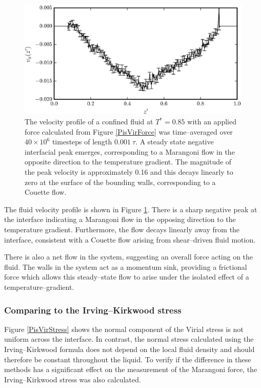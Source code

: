 \begin{figure}[h!]
\centering
\includegraphics[scale=1.0]{PisVirFlow}
\caption{The velocity profile of a confined fluid at $T^{*}=0.85$ with an applied force calculated from Figure \ref{PisVirForce} was time--averaged over $40 \times 10^{6}$ timesteps of length $0.001\ \tau$.
A steady state negative interfacial peak emerges, corresponding to a Marangoni flow in the opposite direction to the temperature gradient.
The magnitude of the peak velocity is approximately 0.16 and this decays linearly to zero at the surface of the bounding walls, corresponding to a Couette flow.}
\label{PisVirFlow}
\end{figure}
The fluid velocity profile is shown in Figure \ref{PisVirFlow}. 
There is a sharp negative peak at the interface indicating a Marangoni flow in the opposing direction to the temperature gradient.
Furthermore, the flow decays linearly away from the interface, consistent with a Couette flow arising from shear--driven fluid motion.\cite{FluidMech}

There is also a net flow in the system, suggesting an overall force acting on the fluid.
The walls in the system act as a momentum sink, providing a frictional force which allows this steady--state flow to arise under the isolated effect of a temperature--gradient.
\FloatBarrier

\subsubsection{Comparing to the Irving--Kirkwood stress}
Figure \ref{PisVirStress} shows the normal component of the Virial stress is not uniform across the interface.
In contrast, the normal stress calculated using the Irving--Kirkwood formula does not depend on the local fluid density and should therefore be constant throughout the liquid.
To verify if the difference in these methods has a significant effect on the measurement of the Marangoni force, the Irving--Kirkwood stress was also calculated.


